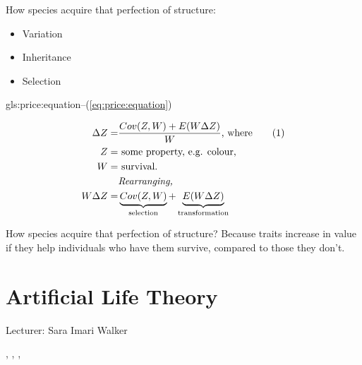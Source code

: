 \documentclass[]{article}
\newcommand\numberthis{\addtocounter{equation}{1}\tag{\theequation}}
\begin{document}
How species acquire that perfection of structure:
\begin{itemize}
	\item Variation
	\item Inheritance
	\item Selection
\end{itemize}

\gls{gls:price:equation}--(\ref{eq:price:equation})

\begin{align*}
\Delta Z =& \frac{Cov(Z,W) + E(W \Delta Z)}{W}\text{, where} \numberthis \label{eq:price:equation}\\
Z=& \text{ some property, e.g. colour,}\\
W=& \text{ survival.}\\
 & \textit{Rearranging, }\\
W \Delta Z =& \underbrace{Cov(Z,W)}_\text{selection} + \underbrace{E(W \Delta Z)}_\text{transformation}
\end{align*}

How species acquire that perfection of structure? Because traits increase in value if they help individuals who have them survive, compared to those they don't.


\section{Artificial Life Theory}

Lecturer: Sara Imari Walker


\cite{neumann1966theory}, \cite{neumann1958computer}, \cite{janzing2010there}, \cite{schaeffer2014physicallyuniversal}


\printglossaries

 


\end{document}
